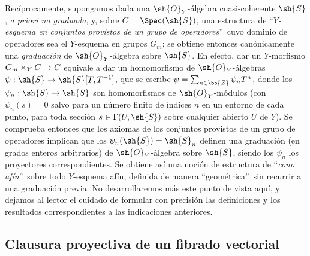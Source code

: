 \documentclass[oneside,10pt]{amsart}
\makeatletter
\newcommand{\ega@arrow}[2]{\mathchoice{#1}{#2}{#2}{#2}}
\renewcommand{\to}{\ega@arrow{\longrightarrow}{\rightarrow}}
\newcommand{\oldpage}[2][]{\marginnote{\normalfont\footnotesize\textbf{#1}~|~#2}\ignorespaces}
\let\EGAOriginalLabel\label
\renewcommand{\label}[1]{\phantomsection\EGAOriginalLabel{#1}}
\makeatother
\begin{document}
\begin{remark}[8.3.9]
Recíprocamente, supongamos dada una $\sh{O}_Y$-álgebra cuasi-coherente $\sh{S}$, \emph{a priori no graduada}, y, sobre $C=\Spec(\sh{S})$, una estructura de \textquotedblleft\emph{$Y$-esquema en conjuntos provistos de un grupo de operadores}\textquotedblright\ cuyo dominio de operadores sea el $Y$-esquema en grupos $G_m$;
se obtiene entonces canónicamente una \emph{graduación} de $\sh{O}_Y$-álgebra sobre $\sh{S}$.
En efecto, dar un $Y$-morfismo $G_m\times_Y C\to C$ equivale a dar un homomorfismo de $\sh{O}_Y$-álgebras $\psi:\sh{S}\to\sh{S}[T,T^{-1}]$, que se escribe $\psi=\sum_{n\in\bb{Z}}\psi_n T^n$, donde los $\psi_n:\sh{S}\to\sh{S}$ son homomorfismos de $\sh{O}_Y$-módulos (con $\psi_n(s)=0$ salvo para un número finito de índices $n$ en un entorno de cada punto, para toda sección $s\in\Gamma(U,\sh{S})$ sobre cualquier abierto $U$ de $Y$).
Se comprueba entonces que los axiomas de los conjuntos provistos de un grupo de operadores implican que los $\psi_n(\sh{S})=\sh{S}_n$ definen una graduación (en grados enteros arbitrarios) de $\sh{O}_Y$-álgebra sobre $\sh{S}$, siendo los $\psi_n$ los proyectores correspondientes.
Se obtiene así una noción de estructura de \textquotedblleft\emph{cono afín}\textquotedblright\ sobre todo $Y$-esquema afín, definida de manera \textquotedblleft geométrica\textquotedblright\ sin recurrir a una graduación previa.
\oldpage[II]{168}
No desarrollaremos más este punto de vista aquí, y dejamos al lector el cuidado de formular con precisión las definiciones y los resultados correspondientes a las indicaciones anteriores.
\end{remark}
\subsection{Clausura proyectiva de un fibrado vectorial}
\label{subsection:II.8.4}
\end{document}
